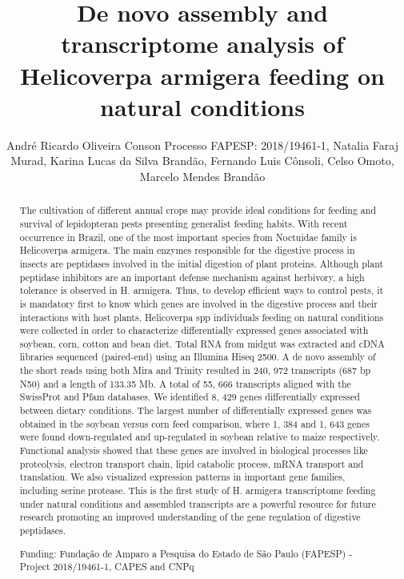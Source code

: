 \documentclass[twoside]{article}
\title{\vspace{-15mm}\fontsize{24pt}{10pt}\selectfont\textbf{ De novo assembly and transcriptome analysis of Helicoverpa armigera feeding on natural conditions }} %
\author{ Andr\'e Ricardo Oliveira Conson Processo FAPESP: 2018/19461-1, Natalia Faraj Murad, Karina Lucas da Silva Brand\~ao, Fernando Luis C\^onsoli, Celso Omoto, Marcelo Mendes Brand\~ao }
\affil{ Unicamp }
\date{}
\begin{document}
  
  
  \maketitle %
  
  
  \thispagestyle{fancy} %
  
  
  \begin{abstract}
  The cultivation of different annual crops may provide ideal conditions for feeding and survival of lepidopteran pests presenting generalist feeding habits. With recent occurrence in Brazil,  one of the most important species from Noctuidae family is Helicoverpa armigera. The main enzymes responsible for the digestive process in insects are peptidases involved in the initial digestion of plant proteins. Although plant peptidase inhibitors are an important defense mechanism against herbivory,  a high tolerance is observed in H. armigera. Thus,  to develop efficient ways to control pests,  it is mandatory first to know which genes are involved in the digestive process and their interactions with host plants. Helicoverpa spp individuals feeding on natural conditions were collected in order to characterize differentially expressed genes associated with soybean,  corn,  cotton and bean diet. Total RNA from midgut was extracted and cDNA libraries sequenced (paired-end) using an Illumina Hiseq 2500. A de novo assembly of the short reads using both Mira and Trinity resulted in 240, 972 transcripts (687 bp N50) and a length of 133.35 Mb. A total of 55, 666 transcripts aligned with the SwissProt and Pfam databases. We identified 8, 429 genes differentially expressed between dietary conditions. The largest number of differentially expressed genes was obtained in the soybean versus corn feed comparison,  where 1, 384 and 1, 643 genes were found down-regulated and up-regulated in soybean relative to maize respectively. Functional analysis showed that these genes are involved in biological processes like proteolysis,  electron transport chain,  lipid catabolic process,  mRNA transport and translation. We also visualized expression patterns in important gene families,  including serine protease. This is the first study of H. armigera transcriptome feeding under natural conditions and assembled transcripts are a powerful resource for future research promoting an improved understanding of the gene regulation of digestive peptidases.
  
  Funding: Funda\c{c}\~ao de Amparo a Pesquisa do Estado de S\~ao Paulo (FAPESP) - Project 2018/19461-1,  CAPES and CNPq \\ 
  \end{abstract}
  
\end{document}
